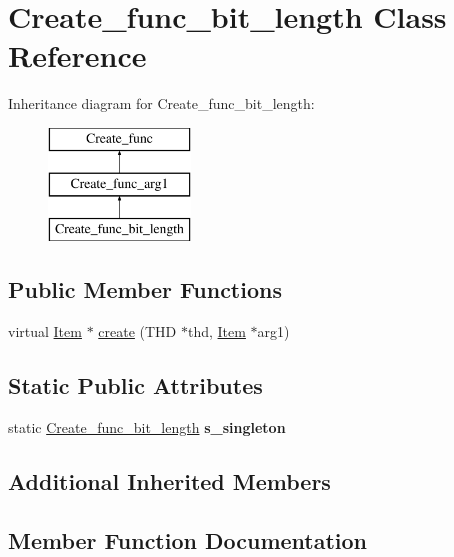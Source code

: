 \hypertarget{classCreate__func__bit__length}{}\section{Create\+\_\+func\+\_\+bit\+\_\+length Class Reference}
\label{classCreate__func__bit__length}
Inheritance diagram for Create\+\_\+func\+\_\+bit\+\_\+length\+:\begin{figure}[H]
\begin{center}
\leavevmode
\includegraphics[height=3.000000cm]{classCreate__func__bit__length}
\end{center}
\end{figure}
\subsection*{Public Member Functions}
\begin{DoxyCompactItemize}
\item 
virtual \mbox{\hyperlink{classItem}{Item}} $\ast$ \mbox{\hyperlink{classCreate__func__bit__length_a1501ec7274c1cc59e05123c8a8cc6ba6}{create}} (T\+HD $\ast$thd, \mbox{\hyperlink{classItem}{Item}} $\ast$arg1)
\end{DoxyCompactItemize}
\subsection*{Static Public Attributes}
\begin{DoxyCompactItemize}
\item 
\mbox{\label{classCreate__func__bit__length_a103954c406dbf7c7e7dc3b2020af01ef}} 
static \mbox{\hyperlink{classCreate__func__bit__length}{Create\+\_\+func\+\_\+bit\+\_\+length}} {\bfseries s\+\_\+singleton}
\end{DoxyCompactItemize}
\subsection*{Additional Inherited Members}


\subsection{Member Function Documentation}
\mbox{\label{classCreate__func__bit__length_a1501ec7274c1cc59e05123c8a8cc6ba6}} 
